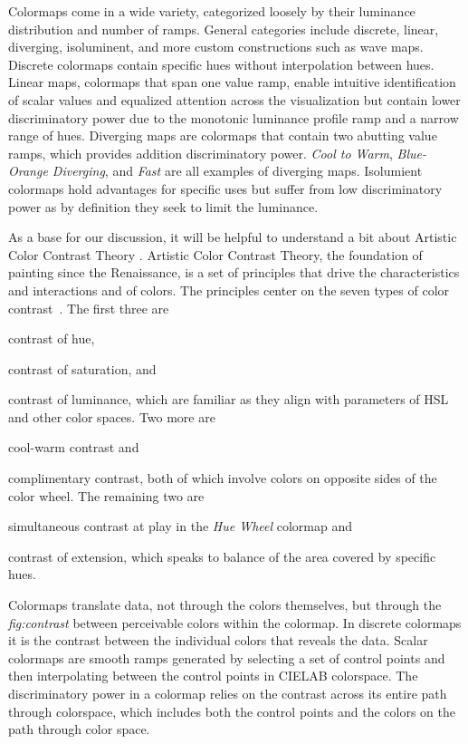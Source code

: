 \documentclass{IEEEcsmag}
\newcommand*{\km}[1]{\textcolor{km}{\emph{\textbf{#1} -- KM}}}
\newcommand*{\colormap}[1]{\textsl{#1}\xspace}
\newcommand*{\huewheel}{\colormap{Hue Wheel}}
\newcommand*{\coolwarm}{\colormap{Cool to Warm}}
\newcommand*{\blueorange}{\colormap{Blue-Orange Diverging}}
\newcommand*{\fast}{\colormap{Fast}}
\begin{document}
Colormaps come in a wide variety, categorized loosely by their luminance distribution and number of ramps.
General categories include discrete, linear, diverging, isoluminent, and more custom constructions such as wave maps.
Discrete colormaps contain specific hues without interpolation between hues.
Linear maps, colormaps that span one value ramp, enable intuitive identification of scalar values and equalized attention across the visualization but contain lower discriminatory power due to the monotonic luminance profile ramp and a narrow range of hues.
Diverging maps are colormaps that contain two abutting value ramps, which provides addition discriminatory power.
\coolwarm, \blueorange, and \fast are all examples of diverging maps.
Isolumient colormaps hold advantages for specific uses but suffer from low discriminatory power as by definition they seek to limit the luminance.

As a base for our discussion, it will be helpful to understand a bit about Artistic Color Contrast Theory \cite{Itten, Albers}. Artistic Color Contrast Theory, the foundation of painting since the Renaissance, is a set of principles that drive the characteristics and interactions and of colors. The principles center on the seven types of color contrast~\cite{Itten}.
The first three are
\begin{inparaenum}[(1)]
\item contrast of hue,
\item contrast of saturation, and
\item contrast of luminance, which are familiar as they align with parameters of HSL and other color spaces.
Two more are
\item cool-warm contrast and
\item complimentary contrast, both of which involve colors on opposite sides of the color wheel.
The remaining two are
\item simultaneous contrast at play in the \huewheel colormap and
\item contrast of extension, which speaks to balance of the area covered by specific hues.
\end{inparaenum}

Colormaps translate data, not through the colors themselves, but through the \textit{fig:contrast} between perceivable colors within the colormap. In discrete colormaps it is the contrast between the individual colors that reveals the data. Scalar colormaps are smooth ramps generated by selecting a set of control points and then interpolating between the control points in CIELAB colorspace. The discriminatory power in a colormap relies on the contrast across its entire path through colorspace, which includes both the control points and the colors on the path through color space.
\end{document}
